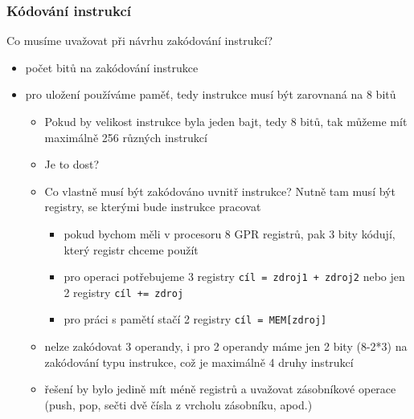 \begin{frame}
\frametitle{Kódování instrukcí}

Co musíme uvažovat při návrhu zakódování instrukcí?
\begin{itemize}
\item počet bitů na zakódování instrukce
\item pro uložení používáme paměť, tedy instrukce musí být zarovnaná na 8 bitů
\begin{itemize}
\item Pokud by velikost instrukce byla jeden bajt, tedy 8 bitů, tak můžeme mít maximálně 256 různých instrukcí
\item Je to dost?
\item Co vlastně musí být zakódováno uvnitř instrukce? Nutně tam musí být registry, se kterými bude instrukce pracovat
\begin{itemize}
\item pokud bychom měli v procesoru 8 GPR registrů, pak 3 bity kódují, který registr chceme použít
\item pro operaci potřebujeme 3 registry \texttt{cíl = zdroj1 + zdroj2} nebo jen 2 registry \texttt{cíl += zdroj}
\item pro práci s pamětí stačí 2 registry \texttt{cíl = MEM[zdroj]}
\end{itemize}
\item nelze zakódovat 3 operandy, i pro 2 operandy máme jen 2 bity (8-2*3) na zakódování typu instrukce, což je maximálně 4 druhy instrukcí
\item řešení by bylo jedině mít méně registrů a uvažovat zásobníkové operace (push, pop, sečti dvě čísla z vrcholu zásobníku, apod.)
\end{itemize}
\end{itemize}
\end{frame}

